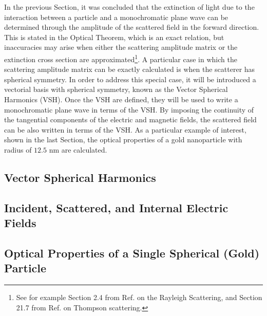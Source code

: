 \documentclass[11pt]{Latex/Classes/PhDthesisPSnPDF}
\begin{document}
     In the previous Section, it was concluded that the extinction of light due to the interaction between a particle and a monochromatic plane wave can be determined through the amplitude of the scattered field in the forward direction. This is stated in the Optical Theorem, which is an exact relation, but inaccuracies may arise when either the scattering amplitude matrix or the extinction cross section are approximated\footnote{See for example Section 2.4 from Ref. \cite{tsang_scattering_2000} on the Rayleigh Scattering, and Section 21.7 from Ref. \cite{zangwill_modern_2013} on Thompson scattering.}. A particular case in which the scattering amplitude matrix can be exactly calculated is when the scatterer has spherical symmetry. In order to address this special case, it will be introduced a vectorial basis with spherical symmetry, known as the Vector Spherical Harmonics (VSH). Once the VSH are defined, they will be used to write a monochromatic plane wave in terms of the VSH. By imposing the continuity of the tangential components of the electric and magnetic fields, the scattered field can be also written in terms of the VSH. As a particular example of interest, shown in the last Section, the optical properties of a gold nanoparticle with radius of $12.5$ nm are calculated.


	    \subsection{Vector Spherical Harmonics}
		 \label{ss:VSH}
		 

        \subsection{Incident, Scattered, and Internal Electric Fields}
	     \label{ss:Fields}
         

        \subsection{Optical Properties of a Single Spherical (Gold) Particle}
		 \label{ss:AuMie}
\end{document}
